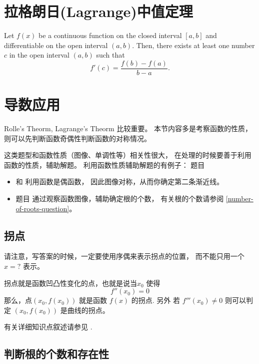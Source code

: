 \section{拉格朗日(Lagrange)中值定理}

\begin{definition}\label{thm:lagrange}
    Let $f(x)$ be a continuous function on the closed interval $[a, b]$ and differentiable on the open interval $(a, b)$. Then, there exists at least one number $c$ in the open interval $(a, b)$ such that
    \[f'(c) = \frac{f(b) - f(a)}{b - a}.\]
\end{definition}

\section{导数应用}

Rolle's Theorm, Lagrange's Theorm 比较重要。
本节内容多是考察函数的性质，则可以先判断函数奇偶性判断函数的对称情况。

这类题型和函数性质（图像、单调性等）相关性很大，
在处理的时候要善于利用函数的性质，辅助解题。
利用函数性质辅助解题的有例子：
题目 
\begin{itemize}

    \item   \cite[page 70, pdf 81, 例1]{we} 和 
            \cite[page 75, pdf 86, 例6]{we}利用函数是偶函数，
            因此图像对称，从而你确定第二条渐近线。

    \item   题目 \cite[page 77, pdf 88, 例5, 例6]{we} 
            通过观察函数图像，辅助确定根的个数，
            有关根的个数请参阅 \ref{number-of-roots-question}。

\end{itemize}

\subsection{拐点}

请注意，写答案的时候，一定要使用序偶来表示拐点的位置，
而不能只用一个 $x=?$ 表示。

拐点就是函数凹凸性变化的点，也就是说当$x_0$ 使得
\[
    f''(x_0) = 0
\]
那么，点$(x_0, f(x_0))$ 就是函数 $f(x)$ 的拐点.
另外 若 $f'''(x_0) \neq 0$ 则可以判定 $(x_0, f(x_0))$ 是曲线的拐点。

有关详细知识点叙述请参见 \cite[page 69, pdf 80]{we}.

\subsection{判断根的个数和存在性}

